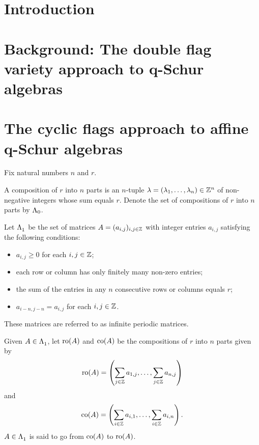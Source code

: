 \documentclass[a4paper, 11pt]{report}
\begin{document}
\maketitle

\tableofcontents

\chapter{Introduction}


\chapter{Background: The double flag variety approach to q-Schur algebras}


\chapter{The cyclic flags approach to affine q-Schur algebras}

Fix natural numbers $n$ and $r$.

\begin{definition}[compositions]\label{def:compositions}
A composition of $r$ into $n$ parts is an $n$-tuple $\lambda=(\lambda_1,\ldots,\lambda_n)\in\mathbb{Z}^n$ of non-negative integers whose sum equals $r$. Denote the set of compositions of $r$ into $n$ parts by ${\Lambda_0}$.
\end{definition}

\begin{definition}\label{def:matrices}
Let $\Lambda_1^{}$ be the set of matrices $A=(a_{i,j})_{i,j\in\mathbb{Z}}$ with integer entries $a_{i,j}$ satisfying the following conditions: 
\begin{itemize}
\item
$a_{i,j}\geq 0$ for each $i,j\in\mathbb{Z}$;
\item
each row or column has only finitely many non-zero entries;
\item
the sum of the entries in any $n$ consecutive rows or columns equals $r$;
\item
$a_{i-n,j-n}=a_{i,j}$ for each $i,j\in\mathbb{Z}$.
\end{itemize}
These matrices are referred to as infinite periodic matrices.
\end{definition}

\begin{definition}\label{def:source-target}
Given $A\in\Lambda_1^{}$, let $\operatorname{ro}(A)$ and $\operatorname{co}(A)$ be the compositions of $r$ into $n$ parts given by
\begin{equation*}
\operatorname{ro}(A) = \left( \sum_{j\in\mathbb{Z}}a_{1,j}, \ldots, \sum_{j\in\mathbb{Z}} a_{n,j}\right)
\end{equation*}
and
\begin{equation*}
\operatorname{co}(A) = \left( \sum_{i\in\mathbb{Z}} a_{i,1}, \ldots, \sum_{i\in\mathbb{Z}} a_{i,n}\right).
\end{equation*}
$A\in\Lambda_1^{}$ is said to go from $\operatorname{co}(A)$ to $\operatorname{ro}(A)$.
\end{definition}
\end{document}
